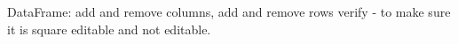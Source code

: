 DataFrame:
add and remove columns,
add and remove rows
verify - to make sure it is square
editable and not editable.



